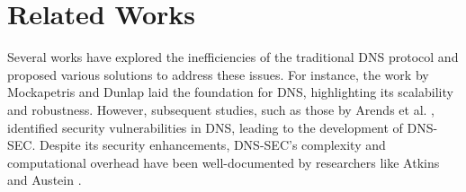 \documentclass[conference]{IEEEtran}
\begin{document}

\section{Related Works}
Several works have explored the inefficiencies of the traditional DNS protocol and proposed various solutions to address these issues. For instance, the work by Mockapetris and Dunlap \cite{mockapetris1983dns} laid the foundation for DNS, highlighting its scalability and robustness. However, subsequent studies, such as those by Arends et al. \cite{rfc4033}, identified security vulnerabilities in DNS, leading to the development of DNS-SEC. Despite its security enhancements, DNS-SEC's complexity and computational overhead have been well-documented by researchers like Atkins and Austein \cite{rfc3833}.
\end{document}
